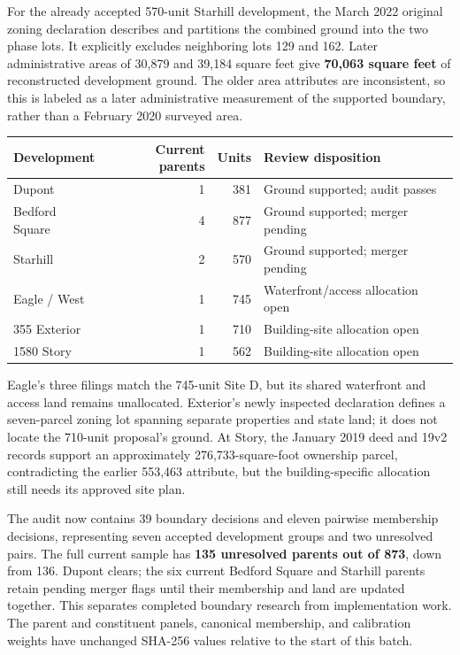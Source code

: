 For the already accepted 570-unit Starhill development, the March 2022 original
zoning declaration describes and partitions the combined ground into the two
phase lots. It explicitly excludes neighboring lots 129 and 162. Later
administrative areas of 30,879 and 39,184 square feet give \textbf{70,063 square
feet} of reconstructed development ground. The older area attributes are
inconsistent, so this is labeled as a later administrative measurement of the
supported boundary, rather than a February 2020 surveyed area.

\begin{center}
\small
\begin{tabular}{lrrl}
\hline
Development & Current parents & Units & Review disposition \\
\hline
Dupont & 1 & 381 & Ground supported; audit passes \\
Bedford Square & 4 & 877 & Ground supported; merger pending \\
Starhill & 2 & 570 & Ground supported; merger pending \\
Eagle / West & 1 & 745 & Waterfront/access allocation open \\
355 Exterior & 1 & 710 & Building-site allocation open \\
1580 Story & 1 & 562 & Building-site allocation open \\
\hline
\end{tabular}
\end{center}

Eagle's three filings match the 745-unit Site D, but its shared waterfront and
access land remains unallocated. Exterior's newly inspected declaration defines
a seven-parcel zoning lot spanning separate properties and state land; it does
not locate the 710-unit proposal's ground. At Story, the January 2019 deed and
19v2 records support an approximately 276,733-square-foot ownership parcel,
contradicting the earlier 553,463 attribute, but the building-specific allocation
still needs its approved site plan.

The audit now contains 39 boundary decisions and eleven pairwise membership
decisions, representing seven accepted development groups and two unresolved
pairs. The full current sample has \textbf{135 unresolved parents out of 873},
down from 136. Dupont clears; the six current Bedford Square and Starhill parents
retain pending merger flags until their membership and land are updated
together. This separates completed boundary research from implementation work.
The parent and constituent panels, canonical membership, and calibration
weights have unchanged SHA-256 values relative to the start of this batch.

